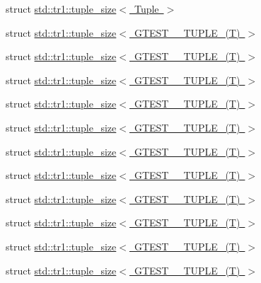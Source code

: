\begin{DoxyCompactItemize}
\item 
struct \mbox{\hyperlink{structstd_1_1tr1_1_1tuple__size}{std\+::tr1\+::tuple\+\_\+size$<$ Tuple $>$}}
\item 
struct \mbox{\hyperlink{structstd_1_1tr1_1_1tuple__size_3_01GTEST__0__TUPLE___07T_08_01_4}{std\+::tr1\+::tuple\+\_\+size$<$ G\+T\+E\+S\+T\+\_\+\_\+\+T\+U\+P\+L\+E\+\_\+(\+T) $>$}}
\item 
struct \mbox{\hyperlink{structstd_1_1tr1_1_1tuple__size_3_01GTEST__1__TUPLE___07T_08_01_4}{std\+::tr1\+::tuple\+\_\+size$<$ G\+T\+E\+S\+T\+\_\+\_\+\+T\+U\+P\+L\+E\+\_\+(\+T) $>$}}
\item 
struct \mbox{\hyperlink{structstd_1_1tr1_1_1tuple__size_3_01GTEST__2__TUPLE___07T_08_01_4}{std\+::tr1\+::tuple\+\_\+size$<$ G\+T\+E\+S\+T\+\_\+\_\+\+T\+U\+P\+L\+E\+\_\+(\+T) $>$}}
\item 
struct \mbox{\hyperlink{structstd_1_1tr1_1_1tuple__size_3_01GTEST__3__TUPLE___07T_08_01_4}{std\+::tr1\+::tuple\+\_\+size$<$ G\+T\+E\+S\+T\+\_\+\_\+\+T\+U\+P\+L\+E\+\_\+(\+T) $>$}}
\item 
struct \mbox{\hyperlink{structstd_1_1tr1_1_1tuple__size_3_01GTEST__4__TUPLE___07T_08_01_4}{std\+::tr1\+::tuple\+\_\+size$<$ G\+T\+E\+S\+T\+\_\+\_\+\+T\+U\+P\+L\+E\+\_\+(\+T) $>$}}
\item 
struct \mbox{\hyperlink{structstd_1_1tr1_1_1tuple__size_3_01GTEST__5__TUPLE___07T_08_01_4}{std\+::tr1\+::tuple\+\_\+size$<$ G\+T\+E\+S\+T\+\_\+\_\+\+T\+U\+P\+L\+E\+\_\+(\+T) $>$}}
\item 
struct \mbox{\hyperlink{structstd_1_1tr1_1_1tuple__size_3_01GTEST__6__TUPLE___07T_08_01_4}{std\+::tr1\+::tuple\+\_\+size$<$ G\+T\+E\+S\+T\+\_\+\_\+\+T\+U\+P\+L\+E\+\_\+(\+T) $>$}}
\item 
struct \mbox{\hyperlink{structstd_1_1tr1_1_1tuple__size_3_01GTEST__7__TUPLE___07T_08_01_4}{std\+::tr1\+::tuple\+\_\+size$<$ G\+T\+E\+S\+T\+\_\+\_\+\+T\+U\+P\+L\+E\+\_\+(\+T) $>$}}
\item 
struct \mbox{\hyperlink{structstd_1_1tr1_1_1tuple__size_3_01GTEST__8__TUPLE___07T_08_01_4}{std\+::tr1\+::tuple\+\_\+size$<$ G\+T\+E\+S\+T\+\_\+\_\+\+T\+U\+P\+L\+E\+\_\+(\+T) $>$}}
\item 
struct \mbox{\hyperlink{structstd_1_1tr1_1_1tuple__size_3_01GTEST__9__TUPLE___07T_08_01_4}{std\+::tr1\+::tuple\+\_\+size$<$ G\+T\+E\+S\+T\+\_\+\_\+\+T\+U\+P\+L\+E\+\_\+(\+T) $>$}}
\item 
struct \mbox{\hyperlink{structstd_1_1tr1_1_1tuple__size_3_01GTEST__10__TUPLE___07T_08_01_4}{std\+::tr1\+::tuple\+\_\+size$<$ G\+T\+E\+S\+T\+\_\+\_\+\+T\+U\+P\+L\+E\+\_\+(\+T) $>$}}

\end{DoxyCompactItemize}
